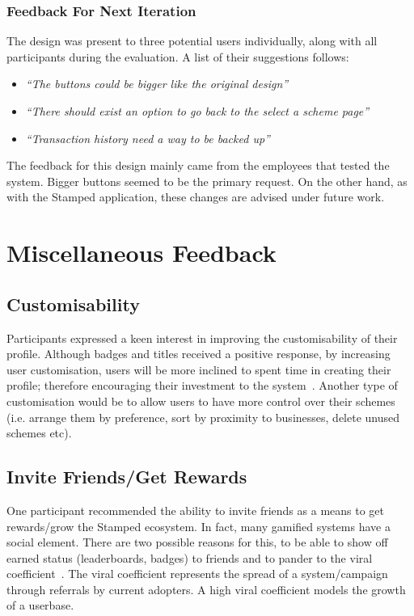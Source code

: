 \subsubsection{Feedback For Next Iteration}
The design was present to three potential users individually, along with all participants during the evaluation. A list of their suggestions follows:
\begin{itemize}
  \item \textit{``The buttons could be bigger like the original design''}
  \item \textit{``There should exist an option to go back to the select a scheme page''}
  \item \textit{``Transaction history need a way to be backed up''}
\end{itemize}

The feedback for this design mainly came from the employees that tested the system. Bigger buttons seemed to be the primary request. On the other hand, as with the Stamped application, these changes are advised under future work.

\section{Miscellaneous Feedback}
\subsection{Customisability}
Participants expressed a keen interest in  improving the customisability of their profile. Although badges and titles received a positive response, by increasing user customisation, users will be more inclined to spent time in creating their profile; therefore encouraging their investment to the system~\cite{winWithGamification}. Another type of customisation would be to allow users to have more control over their schemes (i.e. arrange them by preference, sort by proximity to businesses, delete unused schemes etc).
\subsection{Invite Friends/Get Rewards}
\label{sec:invite}
One participant recommended the ability to invite friends as a means to get rewards/grow the Stamped ecosystem. In fact, many gamified systems have a social element. There are two possible reasons for this, to be able to show off earned status (leaderboards, badges) to friends and to pander to the viral coefficient~\cite{viral}. The viral coefficient represents the spread of a system/campaign through referrals by current adopters. A high viral coefficient models the growth of a userbase.%

